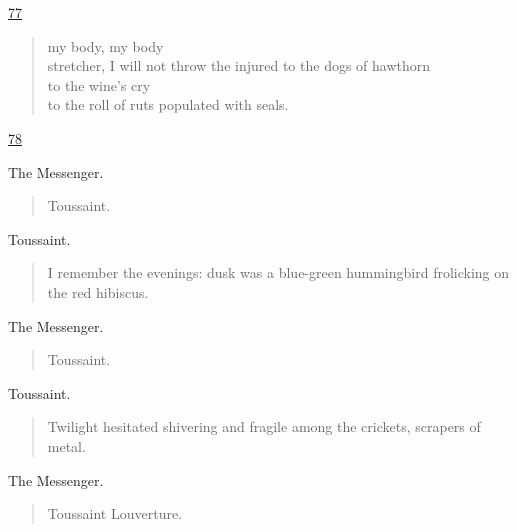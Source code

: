 \documentclass[letterpaper,article,12pt,oneside,notitlepage]{memoir}
\begin{document}
\clearpage

\href{http://cesaire.elotroalex.com/chiens/chiens/p077.html}{77}

\begin{verse}
my body, my body \\
stretcher, I will not throw the injured to the dogs of hawthorn \\
to the wine's cry \\
to the roll of ruts populated with seals. \\
\end{verse}

\clearpage

\href{http://cesaire.elotroalex.com/chiens/chiens/p078.html}{78}

\begin{center}The Messenger.\end{center}

\begin{verse}
Toussaint. \\
\end{verse}

\begin{center}Toussaint.\end{center}

\begin{verse}
\indent I remember the evenings: dusk was a blue-green hummingbird frolicking on the red hibiscus. \\
\end{verse}

\begin{center}The Messenger.\end{center}

\begin{verse}
Toussaint. \\
\end{verse}

\begin{center}Toussaint.\end{center}

\begin{verse}
Twilight hesitated shivering and fragile among the crickets, scrapers of metal. \\
\end{verse}

\begin{center}The Messenger.\end{center}

\begin{verse}
Toussaint Louverture. \\
\end{verse}
\end{document}
